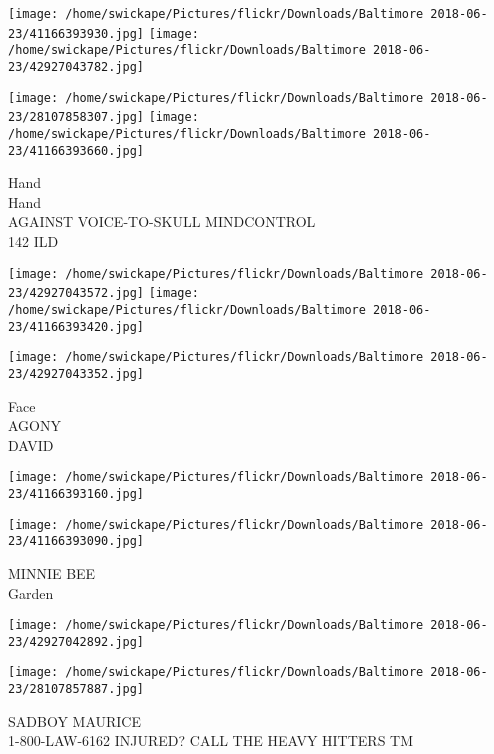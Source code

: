 \documentclass[10pt,letterpaper]{article}
\begin{document}
\texttt{[image: /home/swickape/Pictures/flickr/Downloads/Baltimore 2018-06-23/41166393930.jpg]}
\texttt{[image: /home/swickape/Pictures/flickr/Downloads/Baltimore 2018-06-23/42927043782.jpg]}

\texttt{[image: /home/swickape/Pictures/flickr/Downloads/Baltimore 2018-06-23/28107858307.jpg]}
\texttt{[image: /home/swickape/Pictures/flickr/Downloads/Baltimore 2018-06-23/41166393660.jpg]}

Hand\\
Hand\\
AGAINST VOICE{-}TO{-}SKULL MINDCONTROL\\
142 ILD\\
\pagebreak

\texttt{[image: /home/swickape/Pictures/flickr/Downloads/Baltimore 2018-06-23/42927043572.jpg]}
\texttt{[image: /home/swickape/Pictures/flickr/Downloads/Baltimore 2018-06-23/41166393420.jpg]}

\vspace{0.25in}
\texttt{[image: /home/swickape/Pictures/flickr/Downloads/Baltimore 2018-06-23/42927043352.jpg]}

Face\\
AGONY\\
DAVID\\
\pagebreak

\texttt{[image: /home/swickape/Pictures/flickr/Downloads/Baltimore 2018-06-23/41166393160.jpg]}

\vspace{0.25in}
\texttt{[image: /home/swickape/Pictures/flickr/Downloads/Baltimore 2018-06-23/41166393090.jpg]}

MINNIE BEE\\
Garden\\
\pagebreak

\texttt{[image: /home/swickape/Pictures/flickr/Downloads/Baltimore 2018-06-23/42927042892.jpg]}

\vspace{0.25in}
\texttt{[image: /home/swickape/Pictures/flickr/Downloads/Baltimore 2018-06-23/28107857887.jpg]}

SADBOY MAURICE\\
1{-}800{-}LAW{-}6162 INJURED?  CALL THE HEAVY HITTERS TM\\
\pagebreak
\end{document}
